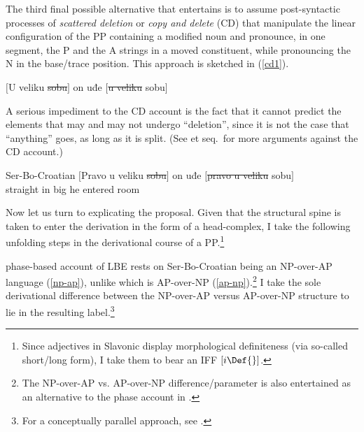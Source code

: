 \documentclass[output=paper]{langsci/langscibook}
\begin{document}
The third final possible alternative that \citet{Boskovic:2005} entertains is
to assume post-syntactic processes of \emph{scattered deletion} or \emph{copy
and delete} (CD) that manipulate the linear configuration of the PP containing
a modified noun and pronounce, in one segment, the P and the A strings in a
moved constituent, while pronouncing the N in the base/trace position.  This
approach is sketched in (\ref{cd1}).

\begin{exe}
	\ex $\big[$U veliku \sout{sobu}$\big]$ on uđe  $\big[$\sout{u veliku} {sobu}$\big]$ \hfill\citep[32n85]{Boskovic:2005}
	\label{cd1}
\end{exe}

A serious impediment to the CD account is the fact that it cannot predict the
elements that may and may not undergo \enquote{deletion}, since it is not the
case that \enquote{anything} goes, as long as it is split. (See
\citealt{Boskovic:2005} et seq.\ for more arguments against the CD
account.)\newpage

\begin{exe}
    \ex Ser-Bo-Croatian
    \gll \llap{*}$\big[$Pravo u veliku \sout{sobu}$\big]$ on  uđe  $\big[$\sout{pravo u veliku} {sobu}$\big]$ \\
        \hphantom{$\big[$}straight in big {} he entered {} room \\
	\trans
\end{exe}

Now let us turn to explicating the proposal. Given that the structural spine is
taken to enter the derivation in the form of a head-complex, I take the
following unfolding steps in the derivational course of a PP.\footnote{Since
    adjectives in Slavonic display morphological definiteness (via so-called
short/long form), I take them to bear an \gls{IFF} $[i\Def{}]$.}

 phase-based account of \gls{LBE} rests on Ser-Bo-Croatian being an NP-over-AP
language (\ref{np-ap}), unlike  which is AP-over-NP
(\ref{ap-np}).\footnote{The NP-over-AP vs. AP-over-NP difference/parameter is
also entertained as an alternative to the phase account in
\citet{Boskovic:2005}.} I take the sole derivational difference between the
NP-over-AP versus AP-over-NP structure to lie in the resulting
label.\footnote{For a conceptually parallel approach, see
\citet{DonatiCecchetto:201}.}
\end{document}

